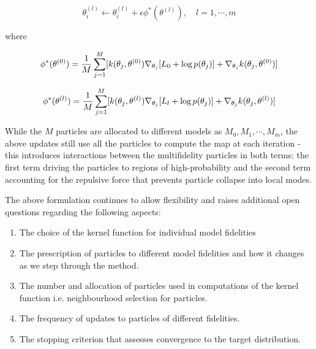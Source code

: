 \documentclass[12pt]{article}
\renewcommand{\[}{\left[}
\renewcommand{\]}{\right]}
\renewcommand{\(}{\left(}
\renewcommand{\)}{\right)}
\newcommand{\grad}[1]{\nabla #1}
\begin{document}
\begin{equation*}
    \theta^{(l)}_i \leftarrow \theta^{(l)}_i + \epsilon \phi^{\ast}(\theta^{(l)}), \quad l=1, \cdots, m
\end{equation*}

where

\begin{equation}
    \phi^{\ast}(\theta^{(0)}) = \frac{1}{M}\sum_{j=1}^{M}[k(\theta_j, \theta^{(0)}) \grad_{\theta_j}[L_{0} + \log p(\theta_j)] + \grad_{\theta_j} k(\theta_j, \theta^{(0)})]
\end{equation}

\begin{equation}
    \phi^{\ast}(\theta^{(l)}) = \frac{1}{M}\sum_{j=1}^{M}[k(\theta_j, \theta^{(l)}) \grad_{\theta_j}[L_{l} + \log p(\theta_j)] + \grad_{\theta_j} k(\theta_j, \theta^{(l)})]
\end{equation}

While the $M$ particles are allocated to different models as $M_0, M_1, \cdots, M_m$, the above updates still use all the particles to compute the map at each iteration - this introduces interactions between the multifidelity particles in both terms: the first term driving the particles to regions of high-probability and the second term accounting for the repulsive force that prevents particle collapse into local modes. 

The above formulation continues to allow flexibility and raises additional open questions regarding the following aspects:

\begin{enumerate}
    \item The choice of the kernel function for individual model fidelities

    \item The prescription of particles to different model fidelities and how it changes as we step through the method.

    \item The number and allocation of particles used in computations of the kernel function i.e. neighbourhood selection for particles.

    \item The frequency of updates to particles of different fidelities.

    \item The stopping criterion that assesses convergence to the target distribution.
\end{enumerate}
\end{document}
